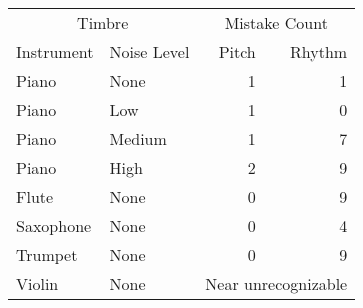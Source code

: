 \begin{tabular}{l l r r}
    \toprule
    \multicolumn{2}{c}{Timbre} & \multicolumn{2}{c}{Mistake Count} \\
    \cmidrule(r){1-2}
    \cmidrule(r){3-4}
    Instrument & Noise Level & Pitch & Rhythm \\
    \midrule
    Piano & None & 1 & 1 \\
    Piano & Low & 1 & 0 \\
    Piano & Medium & 1 & 7 \\
    Piano & High & 2 & 9 \\
    Flute & None & 0 & 9 \\
    Saxophone & None & 0 & 4 \\
    Trumpet & None & 0 & 9 \\
    Violin & None & \multicolumn{2}{c}{Near unrecognizable} \\
    \bottomrule
\end{tabular}